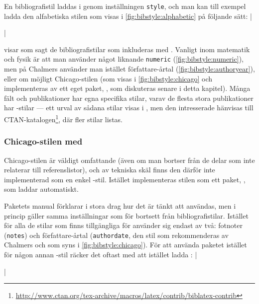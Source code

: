 \documentclass[10pt,../../a4.tex]{subfiles}
\begin{document}
En bibliografistil laddas i  genom inställningen
\texttt{style}, och man kan till exempel ladda den alfabetiska stilen
som visas i \cref{fig:bibstyle:alphabetic} på följande sätt:
\latex|\usepackage[style=alphabetic]{biblatex}|

 visar som sagt de bibliografistilar som inkluderas
med . Vanligt inom matematik och fysik är att man använder
något liknande \texttt{numeric} (\cref{fig:bibstyle:numeric}), men på
Chalmers använder man istället författare-årtal
(\cref{fig:bibstyle:authoryear}), eller om möjligt Chicago-stilen
(som visas i \cref{fig:bibstyle:chicago} och implementeras av ett eget
paket, , som diskuteras senare i detta kapitel).
Många fält och publikationer har egna specifika stilar, varav de flesta
stora publikationer har -stilar — ett urval av sådana
stilar visas i , men den intresserade hänvisas till
CTAN-katalogen\footnote{\url{http://www.ctan.org/tex-archive/macros/latex/contrib/biblatex-contrib}}, där fler stilar listas.

\subsubsection{Chicago-stilen med }
Chicago-stilen \parencite{Chicago10} är väldigt omfattande (även om man
bortser från de delar som inte relaterar till referenslistor), och av
tekniska skäl finns den därför inte implementerad som en enkel
-stil. Istället implementeras stilen som ett paket,
, som laddar  automatiskt.

Paketets manual \parencite{Fussner13} förklarar i stora drag hur det
är tänkt att användas, men i princip gäller samma inställningar som
för  bortsett från bibliografistilar. Istället för alla
de stilar som finns tillgängliga för  använder sig
 endast av två: fotnoter (\texttt{notes})
och författare-årtal (\texttt{authordate}, den stil som rekommenderas
av Chalmers och som syns i \cref{fig:bibstyle:chicago}).
För att använda paketet istället för någon annan -stil
räcker det oftast med att istället ladda :
\latex|\usepackage[authordate,backend=biber]{biblatex-chicago}|
\end{document}
